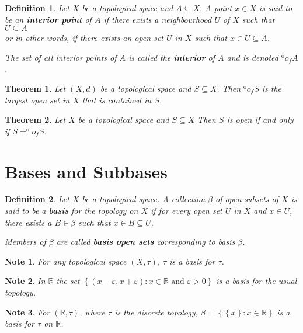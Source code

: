 \documentclass[12pt,twoside]{report}
\newtheorem{defn}{Definition}
\newtheorem{note}{Note}
\newtheorem{thm}{Theorem}
\begin{document}
\begin{defn}
Let $X$ be a topological space and $A \subseteq X$. A point $x \in X$ is said to be an \textbf{interior point} of $A$ if there exists a neighbourhood $U$ of $X$ such that $U \subseteq A$\\ or in other words, if there exists an open set $U$ in $X$ such that $x \in U \subseteq A$. 

The set of all interior points of $A$ is called the \textbf{interior} of $A$ and is denoted $^\mathrm{o} o_f A$.
\end{defn}

\begin{thm}
    Let $\left (X, d\right )$ be a topological space and $S \subseteq X$. Then $^\mathrm{o} o_f S$ is the largest open set in $X$ that is contained in $S$.
\end{thm}

\begin{thm}
    Let $X$ be a topological space and $S \subseteq X$ Then $S$ is open if and only if $S = ^\mathrm{o} o_f S$.
\end{thm}

\section{Bases and Subbases}

\begin{defn}
    Let $X$ be a topological space. A collection $\beta$ of open subsets of $X$ is said to be a \textbf{basis} for the topology on $X$ if for every open set $U$ in $X$ and $x \in U$, there exists a $B \in \beta$ such that $x \in B \subseteq U$.

    Members of $\beta$ are called \textbf{basis open sets} corresponding to basis $\beta$.
\end{defn}

\begin{note}
    For any topological space $\left (X, \tau\right )$, $\tau$ is a basis for $\tau$.
\end{note}

\begin{note}
    In $\mathbb{R}$ the set $\left\{ \left (x - \varepsilon, x + \varepsilon\right )  :  x \in \mathbb{R}\text{ and }\varepsilon >0 \right\}$ is a basis for the usual topology.
\end{note}

\begin{note}
    For $\left (\mathbb{R}, \tau\right )$, where $\tau$ is the discrete topology, $\beta = \left\{ \left\{ x \right\}  :  x \in \mathbb{R} \right\}$ is a basis for $\tau$ on $\mathbb{R}$.
\end{note}
\end{document}

